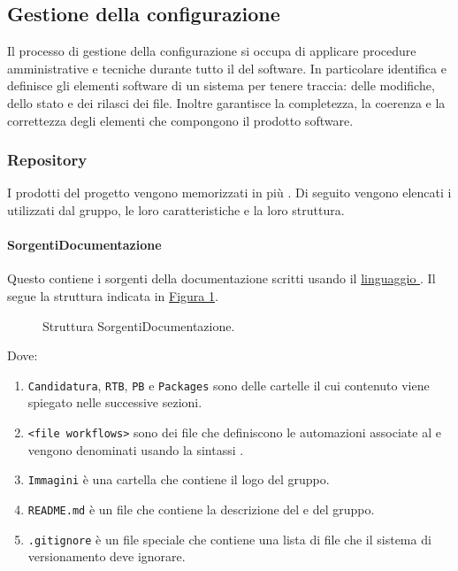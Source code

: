\subsection{Gestione della configurazione}
\label{subsec:gestione_della_configurazione}
Il processo di gestione della configurazione si occupa di applicare procedure amministrative e tecniche durante tutto il  del software. 
In particolare identifica e definisce gli elementi software di un sistema per tenere traccia: delle modifiche, dello stato e dei rilasci dei file.
Inoltre garantisce la completezza, la coerenza e la correttezza degli elementi che compongono il prodotto software.

\subsubsection{Repository}
\label{subsubsec:repository}
I prodotti del progetto vengono memorizzati in più .
Di seguito vengono elencati i  utilizzati dal gruppo, le loro caratteristiche e la loro struttura.

\paragraph{SorgentiDocumentazione}
Questo  contiene i sorgenti della documentazione scritti usando il \hyperref[par:latex]{linguaggio }.
Il  segue la struttura indicata in \hyperref[fig:repo_sorgenti_documenti]{Figura \ref{fig:repo_sorgenti_documenti}}.
\begin{figure}[H]
    \caption{Struttura  SorgentiDocumentazione.}
    \label{fig:repo_sorgenti_documenti}
\end{figure}
Dove:
\begin{enumerate}
    \item \texttt{Candidatura}, \texttt{RTB}, \texttt{PB} e \texttt{Packages} sono delle cartelle il cui contenuto viene spiegato nelle successive sezioni.
    \item \texttt{<file workflows>} sono dei file che definiscono le automazioni associate al  e vengono denominati usando la sintassi .
    \item \texttt{Immagini} è una cartella che contiene il logo del gruppo.
    \item \texttt{README.md} è un file che contiene la descrizione del  e del gruppo.
    \item \texttt{.gitignore} è un file speciale che contiene una lista di file che il sistema di versionamento deve ignorare.
\end{enumerate}

